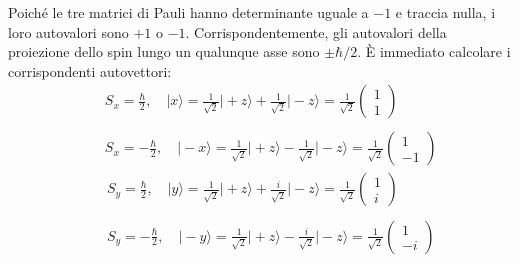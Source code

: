 \documentclass[a4paper,12pt,oneside]{book}
\begin{document}
Poiché le tre matrici di Pauli hanno determinante uguale a $-1$ e traccia nulla, i loro autovalori sono $+1$ o $-1$. Corrispondentemente, gli autovalori della proiezione dello spin lungo un qualunque asse sono $\pm \hbar/2$. È immediato calcolare i corrispondenti autovettori:
\begin{eqnarray}
\label{eq:cap4_4}
& &\displaystyle{S_x = \frac{\hbar}{2}, \quad \vert x \rangle = \frac{1}{\sqrt{2}}\vert +z \rangle + \frac{1}{\sqrt{2}}\vert -z \rangle}= \frac{1}{\sqrt{2}}
\begin{pmatrix}
1\\
1
\end{pmatrix} \nonumber \\
\\
& &\displaystyle{S_x = -\frac{\hbar}{2}, \quad \vert -x \rangle = \frac{1}{\sqrt{2}}\vert +z \rangle - \frac{1}{\sqrt{2}}\vert -z \rangle}= \frac{1}{\sqrt{2}} \begin{pmatrix}
1\\
-1
\end{pmatrix}\nonumber
\end{eqnarray}
\begin{eqnarray}
\label{eq:cap4_5}
& &\displaystyle{S_y = \frac{\hbar}{2}, \quad \vert y \rangle = \frac{1}{\sqrt{2}}\vert +z \rangle + \frac{i}{\sqrt{2}}\vert -z \rangle}= \frac{1}{\sqrt{2}} 
\begin{pmatrix}
1\\
i
\end{pmatrix} \nonumber \\
\\
& &\displaystyle{S_y = -\frac{\hbar}{2}, \quad \vert -y \rangle = \frac{1}{\sqrt{2}}\vert +z \rangle - \frac{i}{\sqrt{2}}\vert -z \rangle}= \frac{1}{\sqrt{2}} 
\begin{pmatrix}
1\\
-i
\end{pmatrix}\nonumber
\end{eqnarray}
\end{document}
